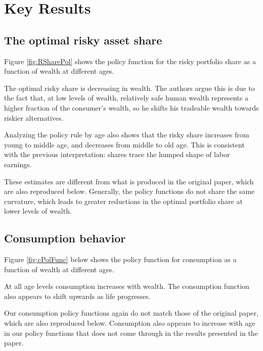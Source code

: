 \documentclass[./CGMPort.tex]{subfiles}
\begin{document}
\hypertarget{Key-Results}{}
\section{Key Results}

\subsection{The optimal risky asset share}

Figure \ref{fig:RSharePol} shows the policy function for the risky portfolio share as a function of wealth at different ages.

The optimal risky share is decreasing in wealth. The authors argue this is due to the fact that, at low levels of wealth, relatively safe human wealth represents a higher fraction of the consumer's wealth, so he shifts his tradeable wealth towards riskier alternatives.

Analyzing the policy rule by age also shows that the risky share increases from young to middle age, and decreases from middle to old age. This is consistent with the previous interpretation: shares trace the humped shape of labor earnings.

These estimates are different from what is produced in the original paper, which are also reproduced below. Generally, the policy functions do not share the same curvature, which leads to greater reductions in the optimal portfolio share at lower levels of wealth.

\providecommand{\figName}{Risky-Share-Policy-Function} %
\providecommand{\figFile}{RShare_Pol} %
\hypertarget{\figFile}{}
\hypertarget{\figName}{}

\subsection{Consumption behavior}

Figure \ref{fig:cPolFunc} below shows the policy function for consumption as a function of wealth at different ages.

At all age levels consumption increases with wealth. The consumption function also appears to shift upwards as life progresses.

Our consumption policy functions again do not match those of the original paper, which are also reproduced below. Consumption also appears to increase with age in our policy functions that does not come through in the results presented in the paper. 
\end{document}
